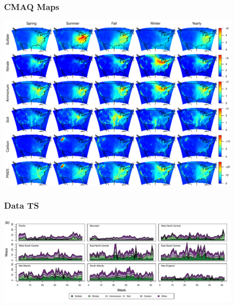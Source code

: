 \documentclass[t]{beamer}\usepackage[]{graphicx}\usepackage[]{color}
\begin{document}


\begin{frame}[label=cmaq]
\frametitle{CMAQ Maps}

\vfill
\begin{center}
\vspace{-4mm}
\includegraphics[width=0.9\textwidth]{figs/pm_maps_cmaq.pdf}
\end{center}
\vfill

\end{frame}



\begin{frame}
\frametitle{Data TS}

\vfill
\begin{center}
\vspace{-4mm}
\includegraphics[width=0.9\textwidth]{figs/pm_ts_data.pdf}
\end{center}
\vfill

\end{frame}


\end{document}
